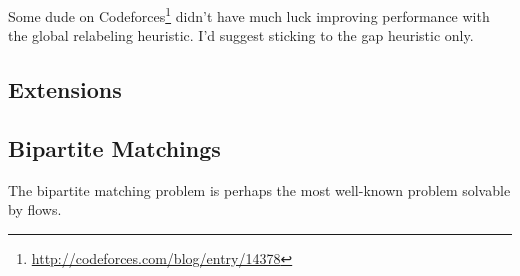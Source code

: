Some dude on Codeforces\footnote{\url{http://codeforces.com/blog/entry/14378}} didn't have much luck improving performance with the global relabeling heuristic. I'd suggest sticking to the gap heuristic only.

\subsection{Extensions}

\subsection{Bipartite Matchings}

The bipartite matching problem is perhaps the most well-known problem solvable by flows.






